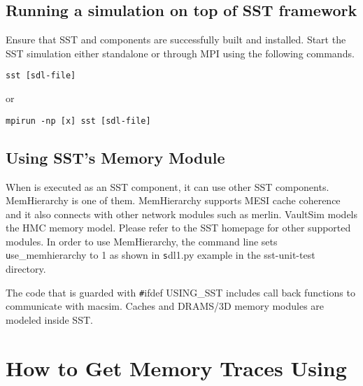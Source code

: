 \subsection{Running a \SIM simulation on top of SST framework}

Ensure that SST and \SIM components are successfully built and installed.  
Start the SST simulation either standalone or through MPI using the following commands.

\begin{Verbatim}
sst [sdl-file]
\end{Verbatim}
or
\begin{Verbatim}
mpirun -np [x] sst [sdl-file]
\end{Verbatim}


\subsection{Using  SST's Memory Module}

When \SIM is executed as an SST component, it can use other SST
components. MemHierarchy  is one of them.  MemHierarchy supports MESI
cache coherence and it also connects with other network modules such
as merlin. VaultSim models the HMC memory model.  Please refer to the SST homepage for other supported modules. 
In order to use MemHierarchy,  the command line sets {\texttt use\_memhierarchy} to 1 as shown in {\texttt sdl1.py} example in the sst-unit-test
directory.  

The code that is guarded with  {\texttt \#ifdef USING\_SST}  includes call
back functions to communicate with macsim.  Caches and DRAMS/3D memory
modules are modeled inside SST. 

\ignore
	  {
	  \section{How to Get Memory Traces Using \SIM}

	  }









